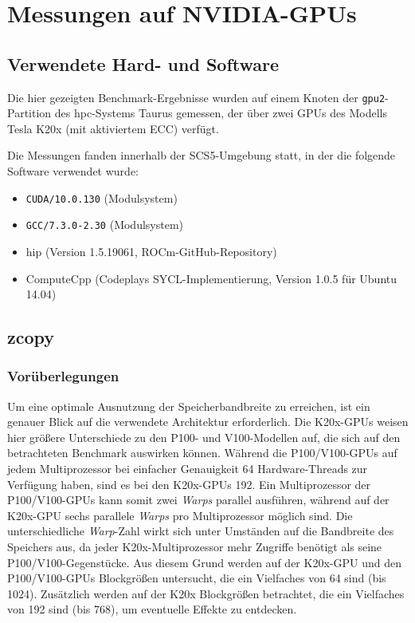 \section{Messungen auf NVIDIA-GPUs}
\label{nvidia}

\subsection{Verwendete Hard- und Software}

Die hier gezeigten Benchmark-Ergebnisse wurden auf einem Knoten der
\texttt{gpu2}-Partition des \gls{hpc}-Systems Taurus gemessen, der über zwei
GPUs des Modells Tesla K20x (mit aktiviertem ECC) verfügt.

Die Messungen fanden innerhalb der SCS5-Umgebung statt, in der die folgende
Software verwendet wurde:

\begin{itemize}
    \item \texttt{CUDA/10.0.130} (Modulsystem)
    \item \texttt{GCC/7.3.0-2.30} (Modulsystem)
    \item \gls{hip} (Version 1.5.19061, ROCm-GitHub-Repository)
    \item ComputeCpp (Codeplays SYCL-Implementierung, Version 1.0.5 für Ubuntu
          14.04)
\end{itemize}

\subsection{zcopy}

\subsubsection{Vorüberlegungen}
\label{nvidia:zcopy:vorueberlegungen}

Um eine optimale Ausnutzung der Speicherbandbreite zu erreichen, ist ein genauer
Blick auf die verwendete Architektur erforderlich. Die K20x-GPUs weisen hier
größere Unterschiede zu den P100- und V100-Modellen auf, die sich auf den
betrachteten Benchmark auswirken können. Während die P100/V100-GPUs auf jedem
Multiprozessor bei einfacher Genauigkeit \num{64} Hardware-Threads zur Verfügung
haben, sind es bei den K20x-GPUs \num{192}. Ein Multiprozessor der
P100/V100-GPUs kann somit zwei \textit{Warps} parallel ausführen, während auf
der K20x-GPU sechs parallele \textit{Warps} pro Multiprozessor möglich sind. Die
unterschiedliche \textit{Warp}-Zahl wirkt sich unter Umständen auf die
Bandbreite des Speichers aus, da jeder K20x-Multiprozessor mehr Zugriffe
benötigt als seine P100/V100-Gegenstücke. Aus diesem Grund werden auf der
K20x-GPU und den P100/V100-GPUs Blockgrößen untersucht, die ein Vielfaches von
\num{64} sind (bis \num{1024}). Zusätzlich werden auf der K20x Blockgrößen
betrachtet, die ein Vielfaches von \num{192} sind (bis \num{768}), um eventuelle
Effekte zu entdecken.

